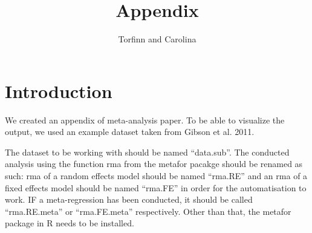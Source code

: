\documentclass[11pt, a4paper]{article} %
\begin{document}



\title{Appendix}

\author{Torfinn and Carolina}

\maketitle



\section{Introduction}%

We created an appendix of meta-analysis paper. To be able to visualize the output, we used an example dataset taken from Gibson et al. 2011.

The dataset to be working with should be named ``data.sub''. The conducted analysis using the function rma from the metafor pacakge should be renamed as such: rma of a random effects model should be named ``rma.RE'' and an rma of a fixed effects model should be named ``rma.FE'' in order for the automatisation to work. IF a meta-regression has been conducted, it should be called ``rma.RE.meta'' or ``rma.FE.meta'' respectively. Other than that, the metafor package in R needs to be installed.  
\end{document}
